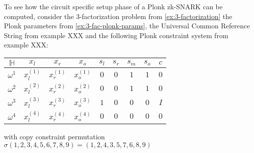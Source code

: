 \begin{example}
\label{ex:3-fac-CSCRS}
To see how the circuit specific setup phase of a Plonk zk-SNARK can be computed, consider the $3$-factorization problem from \ref{ex:3-factorization} the Plonk parameters from \examplename{} \ref{ex:3-fac-plonk-params}, the Universal Common Reference String from example XXX and the following Plonk constraint system from example XXX: 
\begin{table}[H]
\centering
\begin{tabular}{|c|ccc|cccc|c|}
\hline
$\mathbb{H}$ & $x_l$ & $x_r$ & $x_o$ & $s_l$ & $s_r$ & $s_m$ & $s_o$ & $c$ \\ 
\hline
$\omega^1$ & $x_l^{(1)}$ & $x_r^{(1)}$ & $x_o^{(1)}$ & $0$ & $0$ & $1$ & $1$ & $0$ \\
$\omega^2$ & $x_l^{(2)}$ & $x_r^{(2)}$ & $x_o^{(2)}$ & $0$ & $0$ & $1$ & $1$ & $0$ \\
$\omega^3$ & $x_l^{(3)}$ & $x_r^{(3)}$ & $x_o^{(3)}$ & $1$ & $0$ & $0$ & $0$ & $I$ \\
$\omega^4$ & $x_l^{(4)}$ & $x_r^{(4)}$ & $x_o^{(4)}$ & $0$ & $0$ & $0$ & $0$ & $0$ \\ \hline
\end{tabular}
\end{table}
with copy constraint permutation $\sigma(1,2,3,4,5,6,7,8,9) = (1,2,4,3,5,7,6,8,9)$


\end{example}
